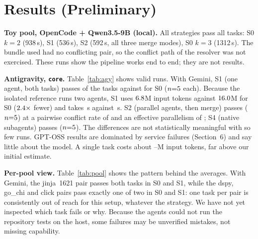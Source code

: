 \documentclass[sigconf,nonacm]{acmart}
\begin{document}
\section{Results (Preliminary)}
\textbf{Toy pool, OpenCode + Qwen3.5-9B (local).} All strategies pass all tasks: S0 $k{=}2$ (938\,s), S1 (536\,s), S2 (592\,s, all three merge modes), S0 $k{=}3$ (1312\,s). The bundle used had no conflicting pair, so the conflict path of the resolver was not exercised. These runs show the pipeline works end to end; they are not results.

\begin{table}[t]
\caption{\texttt{agy} on CooperBench \texttt{core} (5 pools, $k{=}2$, valid runs only, as of \asof; the Gemini set is complete; GPT-OSS was stopped with some runs unfinished). $n$ = valid runs (one run = one bundle); Task pass = fraction of tasks passing; Bundle = both tasks pass; wall and tokens are medians.}
\label{tab:agy}
\small

\end{table}

\textbf{Antigravity, \texttt{core}.} Table~\ref{tab:agy} shows \validruns{} valid runs. With Gemini, S1 (one agent, both tasks) passes \gemOneP{} of the tasks against \gemZeroP{} for S0 ($n{=}5{}$ each). Because the isolated reference runs two agents, S1 uses $6.8$M input tokens against $16.0$M for S0 ($2.4\times$ fewer) and takes \gemOneW\,s against \gemZeroW\,s. S2 (parallel agents, then merge) passes \gemTwoP{} ($n{=}5{}$) at a pairwise conflict rate of \gemTwoC{} and an effective parallelism of \gemTwoPar{}; S4 (native subagents) passes \gemFourP{} ($n{=}5{}$). The differences are not statistically meaningful with so few runs. GPT-OSS results are dominated by service failures (Section~6) and say little about the model. A single task costs about \tokLow--\tokHigh M input tokens, far above our initial estimate.

\begin{table}[t]
\caption{Task pass fraction per pool (valid runs; 1.0 = both tasks pass, -- = no valid run yet).}
\label{tab:pool}
\scriptsize

\end{table}

\textbf{Per-pool view.} Table~\ref{tab:pool} shows the pattern behind the averages. With Gemini, the jinja~1621 pair passes both tasks in S0 and S1, while the dspy, go\_chi and click pairs pass exactly one of two in S0 and S1: one task per pair is consistently out of reach for this setup, whatever the strategy. We have not yet inspected which task fails or why. Because the agents could not run the repository tests on the host, some failures may be unverified mistakes, not missing capability.
\end{document}
